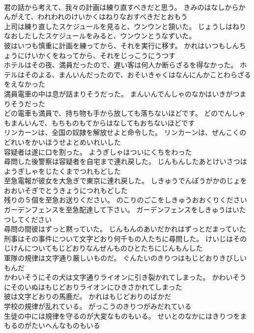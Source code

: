\documentclass[8pt]{extreport}
\begin{document}
\begin{CJK}{UTF8}{min}
\\	君の話から考えて、我々の計画は練り直すべきだと思う。	きみのはなしからかんがえて、われわれのけいかくはねりなおすべきだとおもう 
\\	上司は練り直したスケジュールを見ると、ウンウンと頷いた。	じょうしはねりなおしたしたスケジュールをみると、ウンウンとうなずいた。 
\\	彼はいつも慎重に計画を練ってから、それを実行に移す。	かれはいつもしんちょうにけいかくをねってから、それをじっこうにうつす 
\\	ホテルはその夜、満員だったので、遅い客は何人か断らざるを得なかった。	ホテルはそのよる、まんいんだったので、おそいきゃくはなんにんかことわらざるをえなかった 
\\	満員電車の中は息が詰まりそうだった。	まんいんでんしゃのなかはいきがつまりそうだった 
\\	どの電車も満員で、持ち物も手から放しても落ちないほどです。	どのでんしゃもまんいんで、もちものもてからはなしてもおちないほどです 
\\	リンカーンは、全国の奴隷を解放せよと命令した。	リンカーンは、ぜんこくのどれいをかいほうせよとめいれいした 
\\	容疑者は遂に口を割った。	ようぎしゃはついにくちをわった 
\\	尋問した後警察は容疑者を自宅まで連れ戻した。	じんもんしたあとけいさつはようぎしゃをじたくまでつれもどした 
\\	至急電報が彼女を大急ぎで東京に連れ戻した。	しきゅうでんぽうがかのじょをおおいそぎでとうきょうにつれもどした 
\\	残りの５個を至急お送りください。	のこりのごこをしきゅうおおくりください 
\\	ガーデンフェンスを至急配達して下さい。	ガーデンフェンスをしきゅうはいたつしてください 
\\	尋問の間彼はずっと黙っていた。	じんもんのあいだかれはずっとだまっていた 
\\	刑事はその事件について文字どおり何千もの人たちに尋問した。	けいじはそのじけんについてもじどおりなんぜんものひとたちにじんもんした 
\\	軍隊の規律は文字通り厳しいものだ。	ぐんたいのきりつはもじどおりきびしいもんだ 
\\	かわいそうにその犬は文字通りライオンに引き裂かれてしまった。	かわいそうにそのいぬはもじどおりライオンにひきさかれてしまった 
\\	彼は文字どおりの馬鹿だ。	かれはもじどおりのばかだ 
\\	学校の規律が乱れている。	がっこうのきりつがみだれている 
\\	生徒の中には規律を守るのが大変なものもいる。	せいとのなかにはきりつをまもるのがたいへんなものもいる 

\end{CJK}
\end{document}
